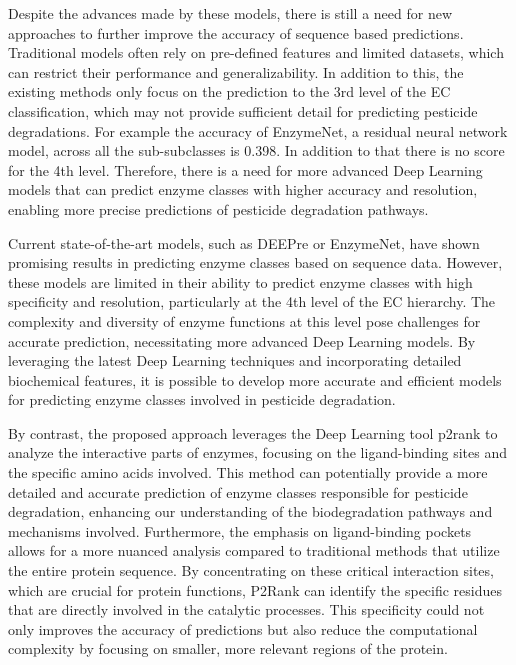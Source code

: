 Despite the advances made by these models, there is still a need for new approaches to further improve the accuracy of sequence based predictions. Traditional models often rely on pre-defined features and limited datasets, which can restrict their performance and generalizability. In addition to this, the existing methods only focus on the prediction to the 3rd level of the EC classification, which may not provide sufficient detail for predicting pesticide degradations. For example the accuracy of EnzymeNet, a residual neural network model, across all the sub-subclasses is 0.398. In addition to that there is no score for the 4th level. Therefore, there is a need for more advanced Deep Learning models that can predict enzyme classes with higher accuracy and resolution, enabling more precise predictions of pesticide degradation pathways. \autocite{watanabeEnzymeNetResidualNeural2023}

Current state-of-the-art models, such as DEEPre or EnzymeNet, have shown promising results in predicting enzyme classes based on sequence data. However, these models are limited in their ability to predict enzyme classes with high specificity and resolution, particularly at the 4th level of the EC hierarchy. The complexity and diversity of enzyme functions at this level pose challenges for accurate prediction, necessitating more advanced Deep Learning models. By leveraging the latest Deep Learning techniques and incorporating detailed biochemical features, it is possible to develop more accurate and efficient models for predicting enzyme classes involved in pesticide degradation.

By contrast, the proposed approach leverages the Deep Learning tool p2rank to analyze the interactive parts of enzymes, focusing on the ligand-binding sites and the specific amino acids involved. This method can potentially provide a more detailed and accurate prediction of enzyme classes responsible for pesticide degradation, enhancing our understanding of the biodegradation pathways and mechanisms involved. Furthermore, the emphasis on ligand-binding pockets allows for a more nuanced analysis compared to traditional methods that utilize the entire protein sequence. By concentrating on these critical interaction sites, which are crucial for protein functions, P2Rank can identify the specific residues that are directly involved in the catalytic processes. This specificity could not only improves the accuracy of predictions but also reduce the computational complexity by focusing on smaller, more relevant regions of the protein. \autocite{krivakP2RankMachineLearning2018}